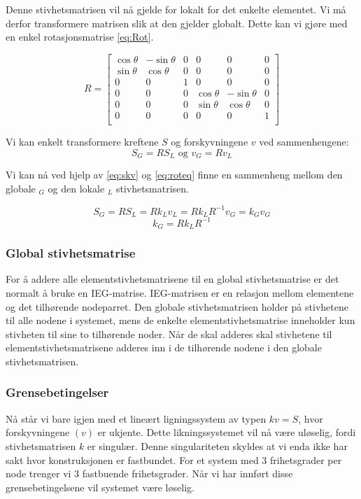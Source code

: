 \documentclass[10pt,a4paper, norsk]{article}
\begin{document}
Denne stivhetsmatrisen vil nå gjelde for lokalt for det enkelte elementet. Vi må derfor transformere matrisen slik at den gjelder globalt. Dette kan vi gjøre med en enkel rotasjonsmatrise \eqref{eq:Rot}. 

\begin{equation} \label{eq:Rot}
R  = \begin{bmatrix}
\cos \theta & -\sin \theta &   0&0&0&0\\[3pt]
\sin \theta & \cos \theta  & 0&0&0&0\\[3pt]
0 &0 & 1&0&0&0\\
0&0&0&\cos \theta & -\sin \theta&   0 \\[3pt]
0&0&0&\sin \theta & \cos \theta  & 0\\[3pt]
0&0&0&0 &0 & 1\\
\end{bmatrix} 
\end{equation}

Vi kan enkelt transformere kreftene $S$ og forskyvningene $v$ ved sammenhengene:
\begin{equation} \label{eq:roteq}
S_G=RS_L  \text{ og } v_G=Rv_L 
\end{equation}

Vi kan nå ved hjelp av \ref{eq:skv} og \ref{eq:roteq} finne en sammenheng mellom den globale $_G$ og den lokale $_L$ stivhetsmatrisen.

\begin{equation}
S_G=RS_L=Rk_Lv_L=Rk_LR^{-1}v_G=k_Gv_G 
\end{equation}
\begin{equation} \label{eq:klkg}
k_G=Rk_LR^{-1}
\end{equation}

\subsubsection{Global stivhetsmatrise}
For å addere alle elementstivhetsmatrisene til en global stivhetsmatrise er det normalt å bruke en IEG-matrise. IEG-matrisen er en relasjon mellom elementene og det tilhørende nodeparret. Den globale stivhetsmatrisen holder på stivhetene til alle nodene i systemet, mens de enkelte elementstivhetsmatrise inneholder kun stivheten til sine to tilhørende noder. Når de skal adderes skal stivhetene til elementstivhetsmatrisene adderes inn i de tilhørende nodene i den globale stivhetsmatrisen. 

\subsubsection{Grensebetingelser}
Nå står vi bare igjen med et lineært ligningssystem av typen $kv=S$, hvor forskyvningene $(v)$ er ukjente. Dette likningssystemet vil nå være uløselig, fordi stivhetsmatrisen $k$ er singulær. Denne singulariteten skyldes at vi enda ikke har sakt hvor konstruksjonen er fastbundet. For et system med 3 frihetsgrader per node trenger vi 3 fastbuende frihetsgrader. Når vi har innført disse grensebetingelsene vil systemet være løselig.
\end{document}
